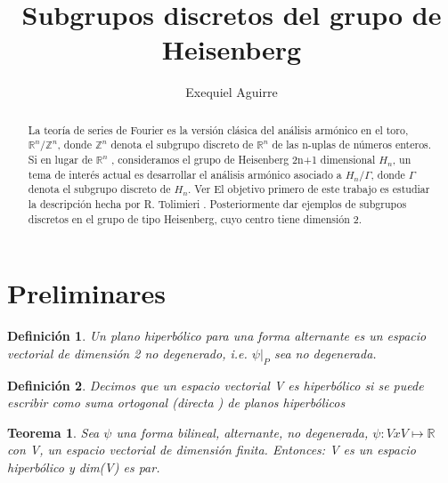 \documentclass[12pt]{article}
\author{Exequiel Aguirre}
\title{Subgrupos discretos del grupo de Heisenberg }
\date{}
\newtheorem{theorem}{Teorema}
\newtheorem{definition}{Definición}
\begin{document}
\maketitle

\begin{abstract}
La teoría de series de Fourier es la versión clásica del análisis armónico en el toro,
$\mathbb{R}^n /\mathbb{Z}^n$, donde $\mathbb{Z}^n$ denota el subgrupo discreto de $\mathbb{R}^n$ de
las n-uplas de números enteros.\newline
Si en lugar de $\mathbb{R}^n$ , consideramos el grupo de Heisenberg 2n+1 dimensional $H_n$, un tema
de interés actual es desarrollar el análisis armónico asociado a $H_n/\Gamma$, donde $\Gamma$ 
denota el subgrupo discreto de $H_n$. Ver \cite{Th} \newline
El objetivo primero de este trabajo es estudiar la descripción hecha por R. Tolimieri \cite{To}.
Posteriormente dar ejemplos de subgrupos discretos en el grupo de tipo Heisenberg, cuyo centro tiene
dimensión 2.

\end{abstract}


 

\section{Preliminares}
\begin{definition} 
 Un plano hiperbólico para una forma alternante es un espacio vectorial de dimensión 2 no degenerado,
  i.e. $\psi|_P$ sea no degenerada. 
\end{definition}

\begin{definition}   
 Decimos que un espacio vectorial V es hiperbólico si se puede escribir como suma ortogonal (directa ) de
 planos hiperbólicos
\end{definition}

\begin{theorem}
 Sea $\psi$ una forma bilineal, alternante, no degenerada, $\psi:VxV\mapsto \mathbb{R}$ con V, un espacio 
 vectorial de dimensión finita.
 Entonces: V es un espacio hiperbólico y dim(V) es par.
\end{theorem}
\end{document}
